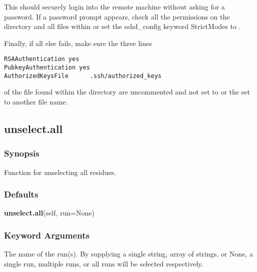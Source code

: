 
This should securely login into the remote machine without asking for a password.  If a password prompt appears, check all the permissions on the directory  and all files within or set the sshd\_config keyword StrictModes to .





Finally, if all else fails, make sure the three lines


{\footnotesize \begin{verbatim}
RSAAuthentication yes
PubkeyAuthentication yes
AuthorizedKeysFile      .ssh/authorized_keys
\end{verbatim}}

of the file  found within the directory  are uncommented and not set to  or the  set to another file name.




\newpage

\subsection{unselect.all}


\subsubsection{Synopsis}

Function for unselecting all residues.



\subsubsection{Defaults}

\textsf{\textbf{unselect.all}(self, run=None)}


\subsubsection{Keyword Arguments}

  The name of the run(s).  By supplying a single string, array of strings, or None, a single run, multiple runs, or all runs will be selected respectively. 





